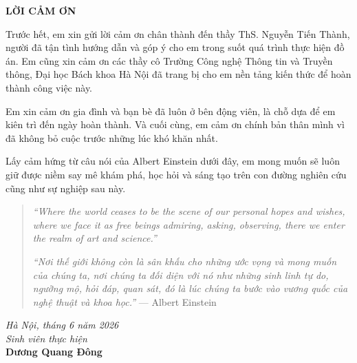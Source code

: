 \documentclass[../DoAn.tex]{subfiles}
\begin{document}
\begin{center}
    \Large{\textbf{LỜI CẢM ƠN}}\\
\end{center}
\vspace{1cm}

Trước hết, em xin gửi lời cảm ơn chân thành đến thầy ThS. Nguyễn Tiến Thành, người đã
tận tình hướng dẫn và góp ý cho em trong suốt quá trình thực hiện đồ án. Em cũng xin
cảm ơn các thầy cô Trường Công nghệ Thông tin và Truyền thông, Đại học Bách khoa Hà
Nội đã trang bị cho em nền tảng kiến thức để hoàn thành công việc này.

Em xin cảm ơn gia đình và bạn bè đã luôn ở bên động viên, là chỗ dựa để em kiên trì
đến ngày hoàn thành. Và cuối cùng, em cảm ơn chính bản thân mình vì đã không bỏ cuộc
trước những lúc khó khăn nhất.

Lấy cảm hứng từ câu nói của Albert Einstein dưới đây, em mong muốn sẽ luôn giữ được niềm say mê khám phá, học hỏi và sáng tạo trên con đường nghiên cứu cũng như sự nghiệp sau này.

\begin{quote}
\textit{``Where the world ceases to be the scene of our personal hopes and wishes, where
we face it as free beings admiring, asking, observing, there we enter the realm of art
and science.''}

\textit{``Nơi thế giới không còn là sân khấu cho những ước vọng và mong muốn của chúng
ta, nơi chúng ta đối diện với nó như những sinh linh tự do, ngưỡng mộ, hỏi đáp, quan
sát, đó là lúc chúng ta bước vào vương quốc của nghệ thuật và khoa học.''}
\hfill --- Albert Einstein
\end{quote}

\vspace{0.5cm}
\begin{flushright}
\textit{Hà Nội, tháng 6 năm 2026}\\
\textit{Sinh viên thực hiện}\\[0.3cm]
\textbf{Dương Quang Đông}
\end{flushright}
\end{document}
